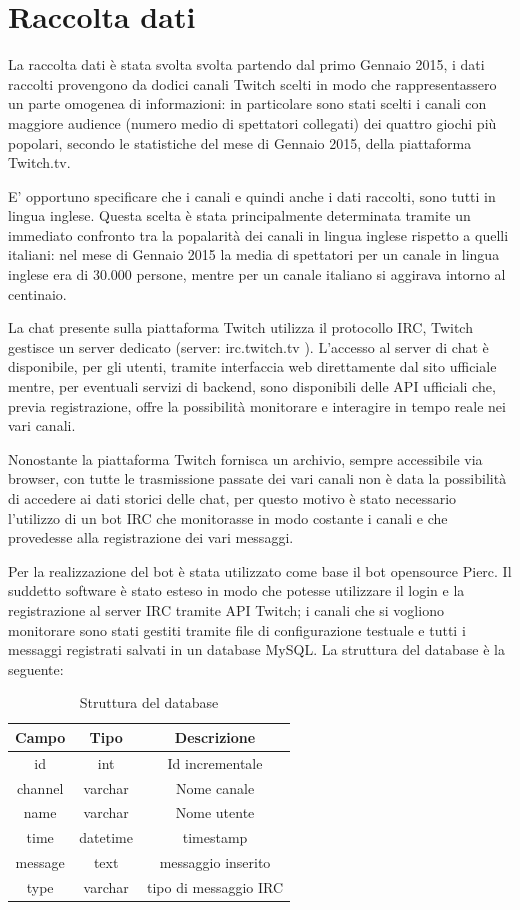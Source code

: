 \documentclass[a4paper,12pt,openright,twoside]{report}
\theoremstyle{definition}
\begin{document}
\section{Raccolta dati}
La raccolta dati è stata svolta svolta partendo dal primo Gennaio 2015, i dati raccolti provengono da dodici canali Twitch scelti in modo che rappresentassero un parte omogenea di informazioni:
in particolare sono stati scelti i canali con maggiore audience (numero medio di spettatori collegati) 
dei quattro giochi più popolari, secondo le statistiche del mese di Gennaio 2015, della piattaforma Twitch.tv.

E' opportuno specificare che i canali e quindi anche i dati raccolti, sono tutti in lingua inglese.
Questa scelta è stata principalmente determinata tramite un immediato confronto tra
la popalarità dei canali in lingua inglese rispetto a quelli italiani: nel mese di Gennaio 2015
la media di spettatori per un canale in lingua inglese era di 30.000 persone, mentre
per un canale italiano si aggirava intorno al centinaio.

La chat presente sulla piattaforma Twitch utilizza il protocollo IRC, Twitch gestisce un server dedicato (server: irc.twitch.tv ). 
L'accesso al server di chat è disponibile,
per gli utenti, tramite interfaccia web direttamente dal sito ufficiale mentre, per eventuali servizi di backend, sono disponibili
delle API ufficiali che, previa registrazione, offre la possibilità monitorare e interagire in tempo reale nei vari canali.

Nonostante la piattaforma Twitch fornisca un archivio, sempre accessibile via browser, con tutte le trasmissione 
passate dei vari canali non è data la possibilità di accedere
ai dati storici delle chat, per questo motivo è stato necessario l'utilizzo di un bot IRC che monitorasse in modo costante i canali e che provedesse alla registrazione dei vari messaggi.

Per la realizzazione del bot è stata utilizzato come base il bot opensource Pierc. Il suddetto software è stato esteso in modo che potesse utilizzare il login e la registrazione al server IRC
tramite API Twitch; i canali che si vogliono monitorare sono stati gestiti tramite file di configurazione testuale e tutti i messaggi registrati salvati in un database MySQL.
La struttura del database è la seguente:

\begin{table}
	\centering
	\begin{tabular}{|c|c|c|}
		\hline
		Campo & Tipo & Descrizione \\
		\hline
		\hline
		id & int & Id incrementale \\
		\hline
		channel & varchar & Nome canale \\
		\hline
		name & varchar & Nome utente \\
		\hline
		time & datetime & timestamp \\
		\hline
		message & text & messaggio inserito \\
		\hline
		type & varchar & tipo di messaggio IRC \\
		\hline
	\end{tabular}
	\caption{Struttura del database}
	\label{tab:strutturaDB}
\end{table}
\end{document}
